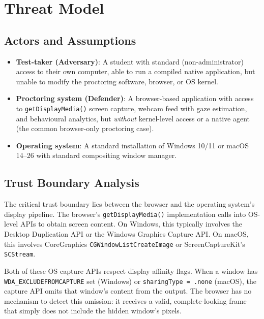 \documentclass[conference]{IEEEtran}
\begin{document}
\section{Threat Model}

\subsection{Actors and Assumptions}

\begin{itemize}
\item \textbf{Test-taker (Adversary)}: A student with standard (non-administrator) access to their own computer, able to run a compiled native application, but unable to modify the proctoring software, browser, or OS kernel.

\item \textbf{Proctoring system (Defender)}: A browser-based application with access to \texttt{getDisplayMedia()} screen capture, webcam feed with gaze estimation, and behavioural analytics, but \textit{without} kernel-level access or a native agent (the common browser-only proctoring case).

\item \textbf{Operating system}: A standard installation of Windows 10/11 or macOS 14--26 with standard compositing window manager.
\end{itemize}

\subsection{Trust Boundary Analysis}

The critical trust boundary lies between the browser and the operating system's display pipeline. The browser's \texttt{getDisplayMedia()} implementation calls into OS-level APIs to obtain screen content. On Windows, this typically involves the Desktop Duplication API or the Windows Graphics Capture API. On macOS, this involves CoreGraphics \texttt{CGWindowListCreateImage} or ScreenCaptureKit's \texttt{SCStream}.

Both of these OS capture APIs respect display affinity flags. When a window has \texttt{WDA\_EXCLUDEFROMCAPTURE} set (Windows) or \texttt{sharingType = .none} (macOS), the capture API omits that window's content from the output. The browser has no mechanism to detect this omission: it receives a valid, complete-looking frame that simply does not include the hidden window's pixels.
\end{document}
